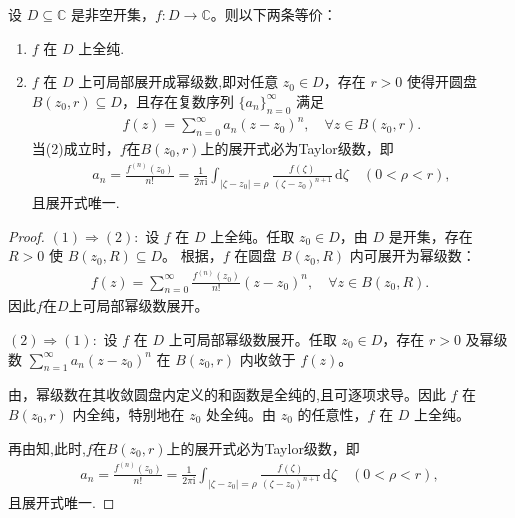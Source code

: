 \documentclass[../../main.tex]{subfiles}%
\begin{document}
\begin{theorem}\label{theorem:可幂级数展开等价函数解析}
设 $D \subseteq \mathbb{C}$ 是非空开集，$f: D \to \mathbb{C}$。则以下两条等价：
\begin{enumerate}[(1)]
\item $f$ 在 $D$ 上全纯.

\item $f$ 在 $D$ 上可局部展开成幂级数,即对任意 $z_0 \in D$，存在 $r > 0$ 使得开圆盘 $B(z_0, r) \subseteq D$，且存在复数序列 $\{a_n\}_{n=0}^{\infty}$ 满足
\begin{align*}
f(z) = \sum_{n=0}^{\infty} a_n (z - z_0)^n, \quad \forall z \in B(z_0, r).
\end{align*}
当(2)成立时，$f$在$B(z_0,r)$上的展开式必为Taylor级数，即
\begin{align*}
a_n = \frac{f^{(n)}(z_0)}{n!} = \frac{1}{2\pi \mathrm{i}} \int_{|\zeta - z_0| = \rho} \frac{f(\zeta)}{(\zeta - z_0)^{n+1}} \, \mathrm{d}\zeta \quad (0 < \rho < r),
\end{align*}
且展开式唯一.
\end{enumerate}
\end{theorem}
\begin{proof}
$(1) \Rightarrow (2):$
设 $f$ 在 $D$ 上全纯。任取 $z_0 \in D$，由 $D$ 是开集，存在 $R > 0$ 使 $B(z_0, R) \subseteq D$。  
根据，$f$ 在圆盘 $B(z_0, R)$ 内可展开为幂级数：
\begin{align*}
f(z) = \sum_{n=0}^{\infty} \frac{f^{(n)}(z_0)}{n!} (z - z_0)^n, \quad \forall z \in B(z_0, R).
\end{align*}
因此$f$在$D$上可局部幂级数展开。

$(2) \Rightarrow (1):$
设 $f$ 在 $D$ 上可局部幂级数展开。任取 $z_0 \in D$，存在 $r > 0$ 及幂级数 $\sum_{n=1}^{\infty} a_n (z - z_0)^n$ 在 $B(z_0, r)$ 内收敛于 $f(z)$。

由，幂级数在其收敛圆盘内定义的和函数是全纯的,且可逐项求导。因此 $f$ 在 $B(z_0, r)$ 内全纯，特别地在 $z_0$ 处全纯。由 $z_0$ 的任意性，$f$ 在 $D$ 上全纯。

再由知,此时,$f$在$B(z_0,r)$上的展开式必为Taylor级数，即
\begin{align*}
a_n = \frac{f^{(n)}(z_0)}{n!} = \frac{1}{2\pi \mathrm{i}} \int_{|\zeta - z_0| = \rho} \frac{f(\zeta)}{(\zeta - z_0)^{n+1}} \, \mathrm{d}\zeta \quad (0 < \rho < r),
\end{align*}
且展开式唯一.
\end{proof}
\end{document}

